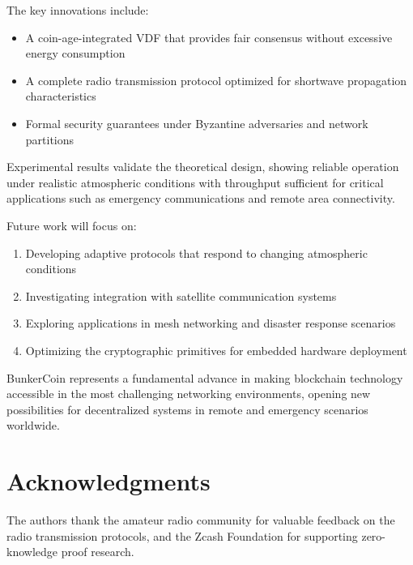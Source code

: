 \documentclass[11pt,a4paper]{article}
\begin{document}
The key innovations include:
\begin{itemize}
\item A coin-age-integrated VDF that provides fair consensus without excessive energy consumption
\item A complete radio transmission protocol optimized for shortwave propagation characteristics
\item Formal security guarantees under Byzantine adversaries and network partitions
\end{itemize}

Experimental results validate the theoretical design, showing reliable operation under realistic atmospheric conditions with throughput sufficient for critical applications such as emergency communications and remote area connectivity.

Future work will focus on:
\begin{enumerate}
\item Developing adaptive protocols that respond to changing atmospheric conditions
\item Investigating integration with satellite communication systems
\item Exploring applications in mesh networking and disaster response scenarios
\item Optimizing the cryptographic primitives for embedded hardware deployment
\end{enumerate}

BunkerCoin represents a fundamental advance in making blockchain technology accessible in the most challenging networking environments, opening new possibilities for decentralized systems in remote and emergency scenarios worldwide.

\section*{Acknowledgments}

The authors thank the amateur radio community for valuable feedback on the radio transmission protocols, and the Zcash Foundation for supporting zero-knowledge proof research.
\end{document}
